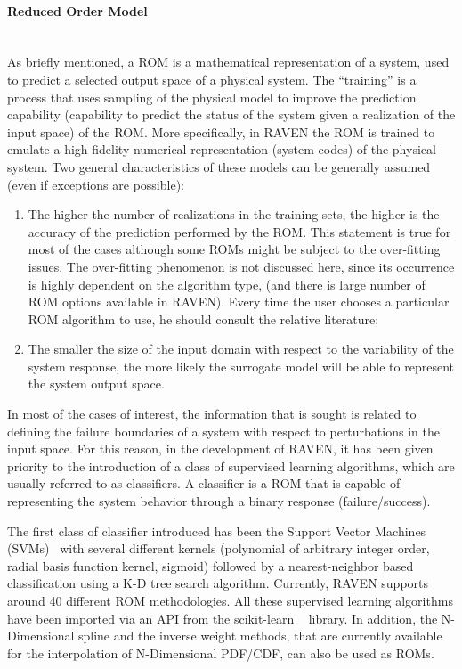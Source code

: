 \paragraph{Reduced Order Model} ~\\
 As briefly mentioned, a ROM is a mathematical representation of a system, used to predict a selected output space of a physical system. 
The ``training'' is a process that uses sampling of the physical model to improve the prediction capability (capability to predict the status of the system given a realization of the input space) of the ROM. More specifically, in RAVEN the ROM is trained to emulate a high fidelity numerical representation (system codes) of the physical system. Two general characteristics of these models can be generally assumed (even if exceptions are possible):
\begin{enumerate}
   \item The higher the number of realizations in the training sets, the higher is the accuracy of the prediction performed by the 
   ROM. This statement is true for most of the cases although some ROMs might be subject to the over-fitting issues. The over-fitting 
   phenomenon is not discussed here, since its occurrence is highly dependent on the algorithm type, (and there is large number of 
   ROM options available in RAVEN). Every time the user chooses a particular ROM algorithm to use, he should consult the relative 
   literature;
   \item The smaller the size of the input domain with respect to the variability of the system response, the more likely the surrogate 
   model will be able to represent the system output space.
\end{enumerate}

In most of the cases of interest, the information that is sought is related to defining the failure boundaries of a system with respect to perturbations in the input space. For this reason, in the development of RAVEN, it has been given priority to the introduction of a class of supervised learning algorithms, which are usually referred to as classifiers. A classifier is a ROM that is capable of representing the system behavior through a binary response (failure/success). 

The first class of classifier introduced has been the Support Vector Machines (SVMs)~\cite{SVM_Burges} with several different kernels (polynomial of arbitrary integer order, radial basis function kernel, sigmoid) followed by a nearest-neighbor based classification using a K-D tree search algorithm. Currently, RAVEN supports around 40 different ROM methodologies. All these supervised learning algorithms have been imported via an API from the scikit-learn ~\cite{SciKitLearn} library. In addition, the N-Dimensional spline and the inverse weight methods, that are currently available for the interpolation of N-Dimensional PDF/CDF, can also be used as ROMs.

